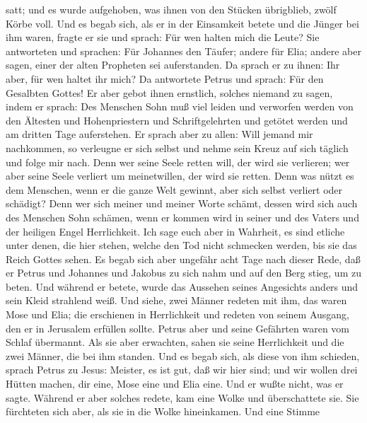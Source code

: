 satt; und es wurde aufgehoben, was ihnen von den Stücken übrigblieb,
zwölf Körbe voll.  Und es begab sich, als er in der
Einsamkeit betete und die Jünger bei ihm waren, fragte er sie und
sprach: Für wen halten mich die Leute?  Sie antworteten
und sprachen: Für Johannes den Täufer; andere für Elia; andere aber
sagen, einer der alten Propheten sei auferstanden.  Da
sprach er zu ihnen: Ihr aber, für wen haltet ihr mich? Da antwortete
Petrus und sprach: Für den Gesalbten Gottes!  Er aber
gebot ihnen ernstlich, solches niemand zu sagen,  indem
er sprach: Des Menschen Sohn muß viel leiden und verworfen werden von
den Ältesten und Hohenpriestern und Schriftgelehrten und getötet werden
und am dritten Tage auferstehen.  Er sprach aber zu
allen: Will jemand mir nachkommen, so verleugne er sich selbst und nehme
sein Kreuz auf sich täglich und folge mir nach.  Denn wer
seine Seele retten will, der wird sie verlieren; wer aber seine Seele
verliert um meinetwillen, der wird sie retten.  Denn was
nützt es dem Menschen, wenn er die ganze Welt gewinnt, aber sich selbst
verliert oder schädigt?  Denn wer sich meiner und meiner
Worte schämt, dessen wird sich auch des Menschen Sohn schämen, wenn er
kommen wird in seiner und des Vaters und der heiligen Engel
Herrlichkeit.  Ich sage euch aber in Wahrheit, es sind
etliche unter denen, die hier stehen, welche den Tod nicht schmecken
werden, bis sie das Reich Gottes sehen.  Es begab sich
aber ungefähr acht Tage nach dieser Rede, daß er Petrus und Johannes und
Jakobus zu sich nahm und auf den Berg stieg, um zu beten.
 Und während er betete, wurde das Aussehen seines
Angesichts anders und sein Kleid strahlend weiß.  Und
siehe, zwei Männer redeten mit ihm, das waren Mose und Elia;
 die erschienen in Herrlichkeit und redeten von seinem
Ausgang, den er in Jerusalem erfüllen sollte.  Petrus
aber und seine Gefährten waren vom Schlaf übermannt. Als sie aber
erwachten, sahen sie seine Herrlichkeit und die zwei Männer, die bei ihm
standen.  Und es begab sich, als diese von ihm schieden,
sprach Petrus zu Jesus: Meister, es ist gut, daß wir hier sind; und wir
wollen drei Hütten machen, dir eine, Mose eine und Elia eine. Und er
wußte nicht, was er sagte.  Während er aber solches
redete, kam eine Wolke und überschattete sie. Sie fürchteten sich aber,
als sie in die Wolke hineinkamen.  Und eine Stimme
